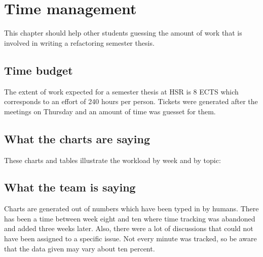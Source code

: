\chapter{Time management}
\thispagestyle{fancy}
This chapter should help other students guessing the amount of work that is 
involved in writing a refactoring semester thesis.

\section{Time budget}
The extent of work expected for a semester thesis at HSR is 8 ECTS which 
corresponds to an effort of 240 hours per person. Tickets were generated after 
the meetings on Thursday and an amount of time was guesset for them. 

\section{What the charts are saying}
These charts and tables illustrate the workload by week and by topic:

\section{What the team is saying}
Charts are generated out of numbers which have been typed in by humans. There 
has been a time between week eight and ten where time tracking was abandoned and 
added three weeks later. Also, there were a lot of discussions that could not 
have been assigned to a specific issue. Not every minute was tracked, so be 
aware that the data given may vary about ten percent.
